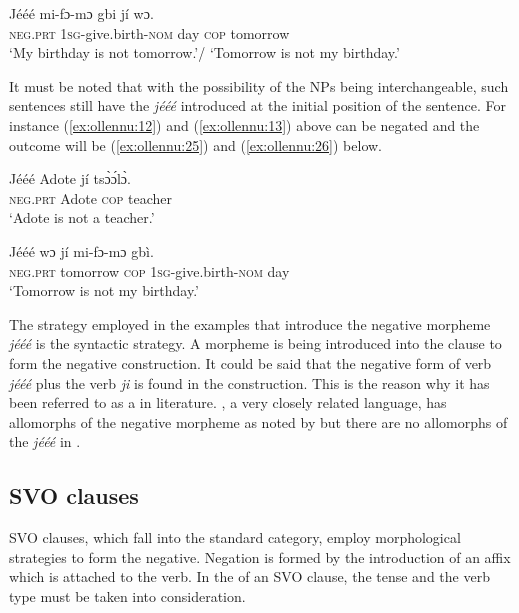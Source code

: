 \documentclass[output=paper,newtxmath,modfonts,nonflat,draftmode]{langsci/langscibook}
\begin{document}
\ea \label{ex:ollennu:24}
\gll Jééé mi-fɔ-mɔ gbi jí wɔ.\\
\textsc{neg}.\textsc{prt} 1\textsc{sg}-give.birth-\textsc{nom} day \textsc{cop} tomorrow\\
\glt 	`My birthday is not tomorrow.'/ `Tomorrow is not my birthday.'
\z

It must be noted that with the possibility of the NPs being interchangeable, such sentences still have the  \textit{jééé} introduced at the initial position of the sentence. For instance (\ref{ex:ollennu:12}) and (\ref{ex:ollennu:13}) above can be negated and the outcome will be (\ref{ex:ollennu:25}) and (\ref{ex:ollennu:26}) below.

\ea \label{ex:ollennu:25}
 \gll Jééé Adote jí ts\`ɔ\'ɔl\`ɔ. \\
\textsc{neg}.\textsc{prt} Adote \textsc{cop} teacher\\
\glt `Adote is not a teacher.'
\z

\ea \label{ex:ollennu:26}
\gll Jééé wɔ jí mi-fɔ-mɔ gbì.\\
\textsc{neg}.\textsc{prt} tomorrow \textsc{cop} 1\textsc{sg}-give.birth-\textsc{nom} day\\
\glt `Tomorrow is not my birthday.'
\z


The strategy employed in the examples that introduce the negative morpheme \textit{jééé} is the syntactic strategy. A morpheme is being introduced into the clause to form the negative construction. It could be said that the negative form of  verb \textit{jééé} plus the  verb \textit{ji} is found in the construction. This is the reason why it has been referred to as a  in  literature. , a very closely related language, has allomorphs of the negative morpheme as noted by \citet{caesar2012} but there are no allomorphs of the \textit{jééé}  in .

\subsection{\label{sec:ollennu:2.3} SVO clauses}

SVO clauses, which fall into the standard  category, employ morphological strategies to form the negative. Negation is formed by the introduction of an affix which is attached to the verb. In the  of an SVO clause, the tense and the verb type must be taken into consideration.
\end{document}
